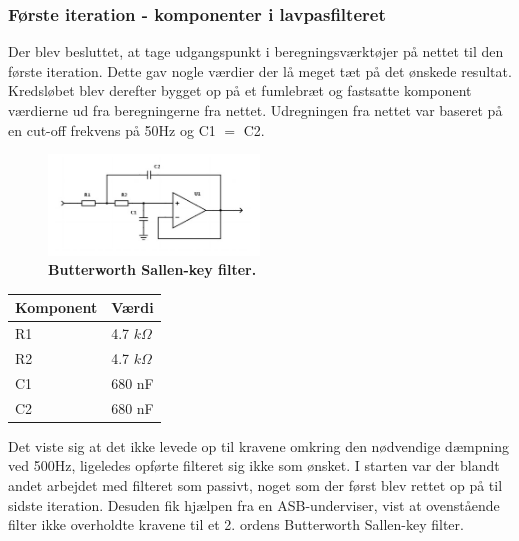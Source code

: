 \subsubsection{Første iteration - komponenter i lavpasfilteret}
Der blev besluttet, at tage udgangspunkt i beregningsværktøjer på nettet \cite{filter}  til den første iteration. Dette gav nogle værdier der lå meget tæt på det ønskede resultat. Kredsløbet blev derefter bygget op på et fumlebræt og fastsatte komponent værdierne ud fra beregningerne fra nettet. Udregningen fra nettet var baseret på en cut-off frekvens på 50Hz og C1 $=$ C2.
\begin{figure}[H]
\includegraphics[width =0.5\textwidth , center]{billeder/butterworth}
\caption{\textbf{Butterworth Sallen-key filter.}}
\end{figure}
\begin{table}[H]
\begin{tabular}{| l | l |}
   \hline
   Komponent & Værdi\\ \hline
   R1 & 4.7 $k\Omega$ \\ \hline
   R2 & 4.7 $k\Omega$ \\ \hline
   C1 & 680 nF\\\hline
   C2 & 680 nF\\\hline
\end{tabular}
\end{table}
Det viste sig at det ikke levede op til kravene omkring den nødvendige dæmpning ved 500Hz, ligeledes opførte filteret sig ikke som ønsket. I starten var der blandt andet arbejdet med filteret som passivt, noget som der først blev rettet op på til sidste iteration. Desuden fik hjælpen fra en ASB-underviser, vist at ovenstående filter ikke overholdte kravene til et 2. ordens Butterworth Sallen-key filter. 
